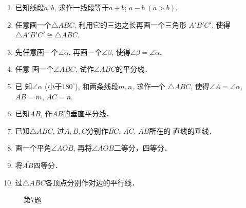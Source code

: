 \begin{ex}
\begin{enumerate}
	\item 已知线段$a,b$, 求作一线段等于$a+b$; $a-b\; (a>b)$.
	\item 任意画一个$\triangle ABC$, 利用它的三边之长再画一个三角形
$A'B'C'$, 使得$\triangle A'B'C'\cong \triangle ABC$.
	\item 先任意画一个$\angle \alpha$, 再画一个$\angle \beta$, 使得$\angle \beta=\angle\alpha$.
	\item 任意
	画一个$\angle ABC$, 试作$\angle ABC$的平分线．
	\item 已
	知$\angle \alpha$ (小于$180^{\circ}$), 和两条线段$m,n$, 求作一个
	$\triangle 
	ABC$, 使得$\angle A=\angle \alpha$, $\overline{AB}=m$, $\overline{AC}=n$.
	\item 已知$\overline{AB}$, 作$\overline{AB}$的垂直平分线．
	\item 已知$\triangle ABC$, 过$A,B,C$分别作$\overline{BC}$, $\overline{AC}$, $\overline{AB}$所在的
	直线的垂线．
	\item 画一个平角$\angle AOB$, 再将$\angle AOB$二等分，四等分．
	\item 将$\overline{AB}$四等分．
	\item 过$\triangle ABC$各顶点分别作对边的平行线．
\end{enumerate}
\end{ex}

\begin{figure}[htp]
	\centering
{}
	\caption*{第7题}
\end{figure}

